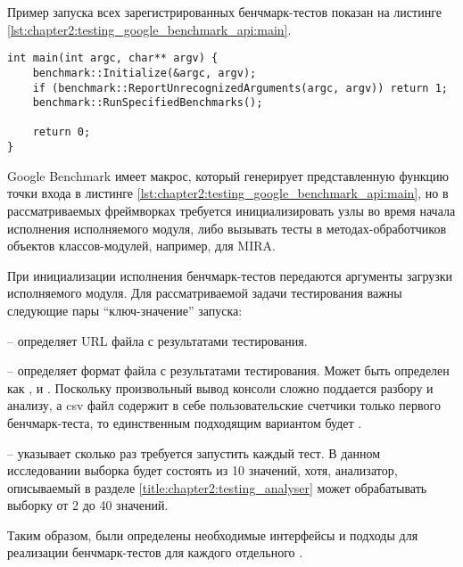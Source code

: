 Пример запуска всех зарегистрированных бенчмарк-тестов показан на листинге \ref{lst:chapter2:testing_google_benchmark_api:main}.
\begin{lstlisting}[label=lst:chapter2:testing_google_benchmark_api:main, caption={Пример запуска всех зарегистрированных тестов при помощи Google Benchmark}]
int main(int argc, char** argv) {
	benchmark::Initialize(&argc, argv);
	if (benchmark::ReportUnrecognizedArguments(argc, argv)) return 1;
	benchmark::RunSpecifiedBenchmarks();
	
	return 0;
}
\end{lstlisting}

Google Benchmark имеет макрос, который генерирует представленную функцию точки входа в листинге \ref{lst:chapter2:testing_google_benchmark_api:main}, но в рассматриваемых фреймворках требуется инициализировать узлы во время начала исполнения исполняемого модуля, либо вызывать тесты в методах-обработчиков объектов классов-модулей, например, для MIRA.

При инициализации исполнения бенчмарк-тестов передаются аргументы загрузки исполняемого модуля. Для рассматриваемой задачи тестирования важны следующие пары \enquote{ключ-значение} запуска:
\begin{description}[noitemsep]
	\item [--benchmark\_out]  -- определяет URL файла с результатами тестирования. 
	\item [--benchmark\_out\_format] -- определяет формат файла с результатами тестирования. Может быть определен как ,  и . Поскольку произвольный вывод консоли сложно поддается разбору и анализу, а csv файл содержит в себе пользовательские счетчики только первого бенчмарк-теста, то единственным подходящим вариантом будет .
	\item [--benchmark\_repetitions] -- указывает сколько раз требуется запустить каждый тест. В данном исследовании выборка будет состоять из 10 значений, хотя, анализатор, описываемый в разделе \ref{title:chapter2:testing_analyser} может обрабатывать выборку от 2 до 40 значений.
\end{description}

Таким образом, были определены необходимые интерфейсы и подходы для реализации бенчмарк-тестов для каждого отдельного \marm{}.